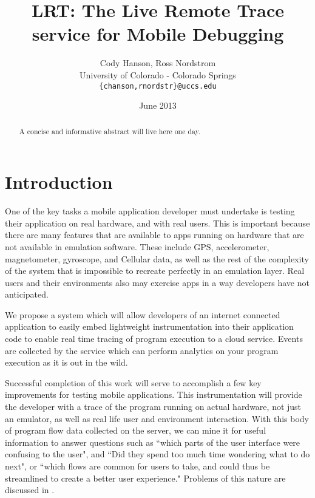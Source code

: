 \documentclass{acm_proc_article-sp}
\begin{document}
\title{LRT: The Live Remote Trace service for Mobile Debugging}
\author{Cody Hanson, Ross Nordstrom\\
        University of Colorado - Colorado Springs\\
        \texttt{\{chanson,rnordstr\}@uccs.edu}
       }
\date{June 2013}

\maketitle

\begin{abstract}
A concise and informative abstract will live here one day.
\end{abstract}

\section{Introduction}
One of the key tasks a mobile application developer must undertake is testing 
their application on real hardware, and with real users. This is important 
because there are many features that are available to apps running on hardware 
that are not available in emulation software. These include GPS, accelerometer, 
magnetometer, gyroscope, and Cellular data, as well as the rest of the 
complexity of the system that is impossible to recreate perfectly in an 
emulation layer. Real users and their environments also may exercise apps in
a way developers have not anticipated. 

We propose a system which will allow developers of an internet connected 
application to easily embed lightweight instrumentation 
into their application code to enable real 
time tracing of program execution to a cloud service. Events are collected by 
the service which can perform analytics on your program execution as it is out 
in the wild.

Successful completion of this work will serve to accomplish a few key 
improvements for testing mobile applications. This instrumentation will provide 
the developer with a trace of the program running on actual hardware, not just 
an emulator, as well as real life user and environment interaction. With this 
body of program flow data collected on the server, we can mine it for useful 
information to answer questions such as ``which parts of the user interface were 
confusing to the user", and ``Did they spend too much time wondering what to do 
next", or ``which flows are common for users to take, and could thus be 
streamlined to create a better user experience." Problems of this nature are 
discussed in \cite{WebAntiPattern}.
\end{document}
